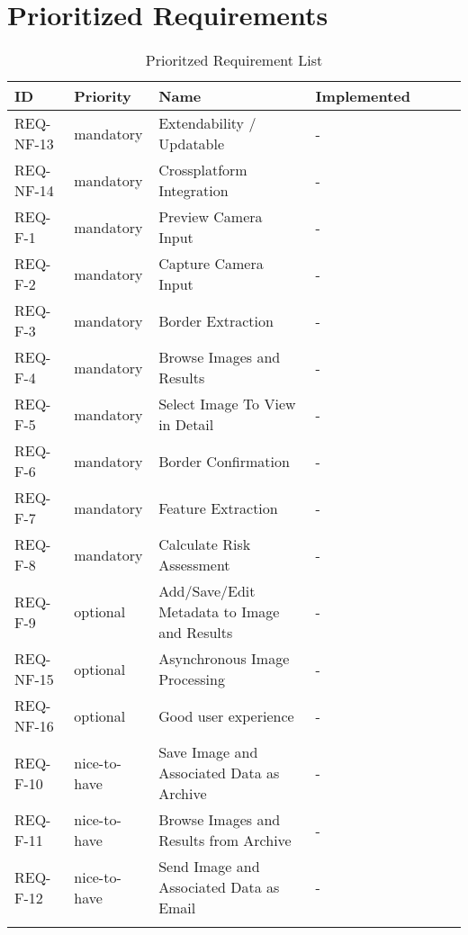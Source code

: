 \section{Prioritized Requirements}

\begin{longtable}{ | l | l | l | l | l | l | l |}
\hline
ID & Priority & Name & Implemented  \\ \hline

REQ-NF-13 & mandatory & Extendability / Updatable & -  \\ \hline
REQ-NF-14 & mandatory & Crossplatform Integration & -  \\ \hline
REQ-F-1 & mandatory & Preview Camera Input & -  \\ \hline
REQ-F-2 & mandatory & Capture Camera Input & -  \\ \hline
REQ-F-3 & mandatory & Border Extraction & -  \\ \hline
REQ-F-4 & mandatory & Browse Images and Results & -  \\ \hline
REQ-F-5 & mandatory & Select Image To View in Detail & -  \\ \hline
REQ-F-6 & mandatory & Border Confirmation & -  \\ \hline
REQ-F-7 & mandatory & Feature Extraction & -  \\ \hline
REQ-F-8 & mandatory & Calculate Risk Assessment & -  \\ \hline
REQ-F-9 & optional & Add/Save/Edit Metadata to Image and Results & -  \\ \hline
REQ-NF-15 & optional & Asynchronous Image Processing & -  \\ \hline
REQ-NF-16 & optional & Good user experience & -  \\ \hline
REQ-F-10 & nice-to-have & Save Image and Associated Data as Archive & -  \\ \hline
REQ-F-11 & nice-to-have & Browse Images and Results from Archive & -  \\ \hline
REQ-F-12 & nice-to-have & Send Image and Associated Data as Email & -  \\ \hline

\caption{Prioritzed Requirement List}
\label{fig:prio_req}
\end{longtable}
